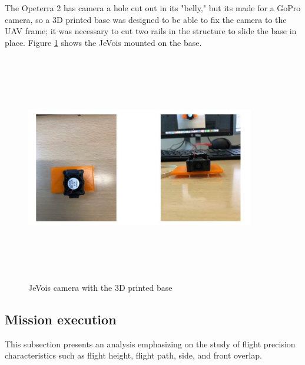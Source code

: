 The Opeterra 2 has camera a hole cut out in its "belly," but its made for a GoPro camera, so a 3D printed base was designed to be able to fix the camera to the UAV frame; it was necessary to cut two rails in the structure to slide the base in place. Figure \ref{fig:base} shows the JeVois mounted on the base.
\begin{figure}[H]
\centering
\includegraphics[width=10cm,height=10cm,keepaspectratio]{imagenes/Base.jpg}
\caption{JeVois camera with the 3D printed base}
\label{fig:base}
\end{figure}
\subsection{Mission execution}
This subsection presents an analysis emphasizing on the study of flight precision characteristics such as flight height, flight path, side, and front overlap. 
